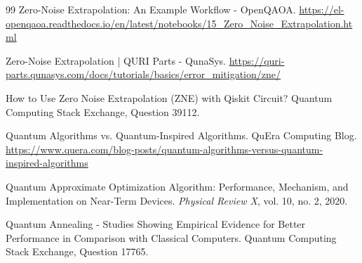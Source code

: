 \documentclass[11pt,a4paper]{article}
\begin{document}
\begin{thebibliography}{99}
Zero-Noise Extrapolation: An Example Workflow - OpenQAOA.
\url{https://el-openqaoa.readthedocs.io/en/latest/notebooks/15_Zero_Noise_Extrapolation.html}

Zero-Noise Extrapolation | QURI Parts - QunaSys.
\url{https://quri-parts.qunasys.com/docs/tutorials/basics/error_mitigation/zne/}

How to Use Zero Noise Extrapolation (ZNE) with Qiskit Circuit?
Quantum Computing Stack Exchange, Question 39112.

Quantum Algorithms vs. Quantum-Inspired Algorithms.
QuEra Computing Blog.
\url{https://www.quera.com/blog-posts/quantum-algorithms-versus-quantum-inspired-algorithms}

Quantum Approximate Optimization Algorithm: Performance, Mechanism, and Implementation on Near-Term Devices.
\textit{Physical Review X}, vol. 10, no. 2, 2020.

Quantum Annealing - Studies Showing Empirical Evidence for Better Performance in Comparison with Classical Computers.
Quantum Computing Stack Exchange, Question 17765.

\end{thebibliography}
\end{document}
